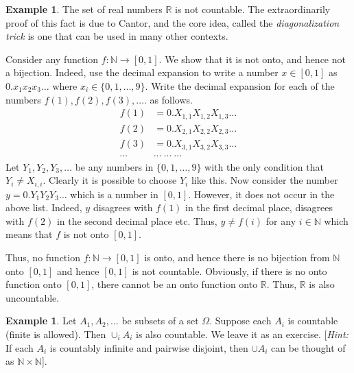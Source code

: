 \documentclass[preprint,  11pt]{amsart}
\theoremstyle{plain} %
\theoremstyle{definition} %
\newtheorem{example}[theorem]{Example}
\begin{document}
\begin{example} The set of real numbers $\mathbb{R}$ is not countable. The extraordinarily proof of this fact is due to Cantor, and the core idea, called the {\em diagonalization trick} is one that can be used in many other contexts. 

Consider any function $f:\mathbb{N} \rightarrow [0,1]$. We show that it is not onto, and hence not a bijection. Indeed, use the decimal expansion to write a number $x\in [0,1]$ as $0.x_{1}x_{2}x_{3}\ldots$ where $x_{i}\in \{0,1,\ldots ,9\}$. Write the decimal expansion for each of the numbers $f(1),f(2),f(3),.\ldots$ as follows.
\begin{align*}
f(1)&=0.X_{1,1}X_{1,2}X_{1,3}\ldots \\
f(2)&=0.X_{2,1}X_{2,2}X_{2,3}\ldots \\
f(3)&=0.X_{3,1}X_{3,2}X_{3,3}\ldots \\
\cdots & \cdots \; \cdots \; \cdots
\end{align*}
Let $Y_{1},Y_{2},Y_{3},\ldots$ be any numbers in $\{0,1,\ldots ,9\}$ with the only condition that $Y_{i}\not= X_{i,i}$. Clearly it is possible to choose $Y_{i}$ like this. Now consider the number $y=0.Y_{1}Y_{2}Y_{3}\ldots$ which is a number in $[0,1]$. However, it does not occur in the above list. Indeed, $y$ disagrees with $f(1)$ in the first decimal place, disagrees with $f(2)$ in the second decimal place etc. Thus, $y\not= f(i)$ for any $i\in \mathbb{N}$ which means that $f$ is not onto $[0,1]$. 

Thus, no function $f:\mathbb{N}\rightarrow [0,1]$ is onto, and hence there is no bijection from $\mathbb{N}$ onto $[0,1]$ and hence $[0,1]$ is not countable. Obviously, if there is no onto function onto $[0,1]$, there cannot be an onto function onto $\mathbb{R}$. Thus, $\mathbb{R}$ is also uncountable.
\end{example}

\begin{example} Let $A_{1},A_{2},\ldots $ be subsets of a set $\Omega$. Suppose each $A_{i}$ is countable (finite is allowed). Then $\cup_{i}A_{i}$ is also countable. We leave it as an exercise. [{\em Hint:} If each $A_{i}$ is countably infinite and pairwise disjoint, then $\cup A_{i}$ can be thought of as $\mathbb{N}\times \mathbb{N}$].
\end{example}
\end{document}
